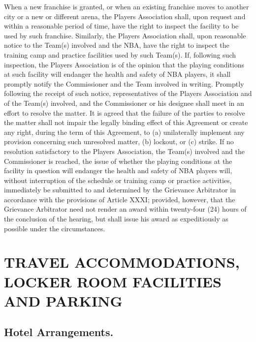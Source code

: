 \documentclass[
]{book}
\begin{document}

When a new franchise is granted, or when an existing franchise moves to another city or a new or different arena, the Players Association shall, upon request and within a reasonable period of time, have the right to inspect the facility to be used by such franchise. Similarly, the Players Association shall, upon reasonable notice to the Team(s) involved and the NBA, have the right to inspect the training camp and practice facilities used by such Team(s). If, following such inspection, the Players Association is of the opinion that the playing conditions at such facility will endanger the health and safety of NBA players, it shall promptly notify the Commissioner and the Team involved in writing. Promptly following the receipt of such notice, representatives of the Players Association and of the Team(s) involved, and the Commissioner or his designee shall meet in an effort to resolve the matter. It is agreed that the failure of the parties to resolve the matter shall not impair the legally binding effect of this Agreement or create any right, during the term of this Agreement, to (a) unilaterally implement any provision concerning such unresolved matter, (b) lockout, or (c) strike. If no resolution satisfactory to the Players Association, the Team(s) involved and the Commissioner is reached, the issue of whether the playing conditions at the facility in question will endanger the health and safety of NBA players will, without interruption of the schedule or training camp or practice activities, immediately be submitted to and determined by the Grievance Arbitrator in accordance with the provisions of Article XXXI; provided, however, that the Grievance Arbitrator need not render an award within twenty-four (24) hours of the conclusion of the hearing, but shall issue his award as expeditiously as possible under the circumstances.

\hypertarget{travel-accommodations-locker-room-facilities-and-parking}{%
\chapter{TRAVEL ACCOMMODATIONS, LOCKER ROOM FACILITIES AND PARKING}\label{travel-accommodations-locker-room-facilities-and-parking}}


\hypertarget{hotel-arrangements.}{%
\section{Hotel Arrangements.}\label{hotel-arrangements.}}
\end{document}
